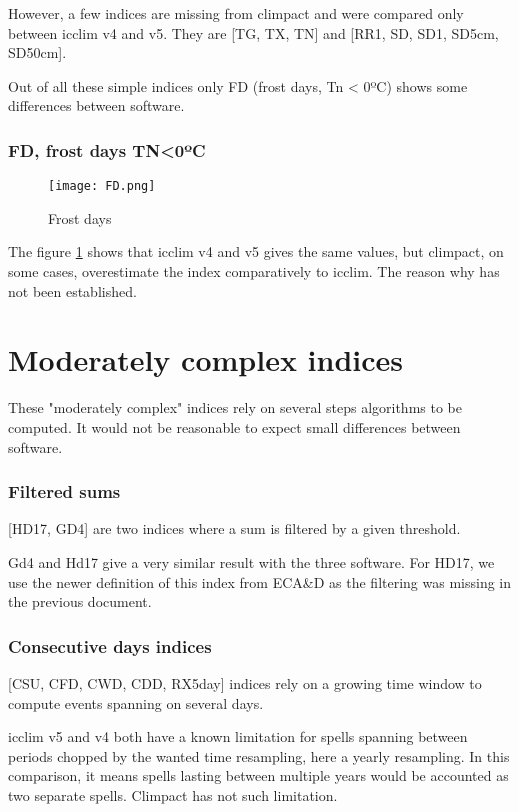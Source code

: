 \documentclass[a4paper,11pt]{article}
\begin{document}
    However, a few indices are missing from climpact and were compared only between icclim v4 and v5. 
    They are [TG, TX, TN] and [RR1, SD, SD1, SD5cm, SD50cm].

    Out of all these simple indices only FD (frost days, Tn < 0ºC) shows some differences between software.

    \section{FD, frost days TN<0ºC}
        \begin{figure}[!hbt]
            \centering
            \texttt{[image: FD.png]}
            \caption{Frost days}
            \label{figure/fd}
        \end{figure}
        The figure \ref{figure/fd} shows that icclim v4 and v5 gives the same values, but climpact, on some cases, overestimate the index comparatively to icclim.
        The reason why has not been established.
        

\part{Moderately complex indices}
    These "moderately complex" indices rely on several steps algorithms to be computed.
    It would not be reasonable to expect small differences between software.

    \section{Filtered sums}
        [HD17, GD4] are two indices where a sum is filtered by a given threshold.

        Gd4 and Hd17 give a very similar result with the three software.
        For HD17, we use the newer definition of this index from ECA\&D \cite{doc/ecad_new} as the filtering was missing in the previous document.

    \section{Consecutive days indices} \label{section/consecutive_days}
        [CSU, CFD, CWD, CDD, RX5day] indices rely on a growing time window to compute events spanning on several days.

        icclim v5 and v4 both have a known limitation for spells spanning between periods chopped by the wanted time resampling, here a yearly resampling.
        In this comparison, it means spells lasting between multiple years would be accounted as two separate spells.
        Climpact has not such limitation.
\end{document}
